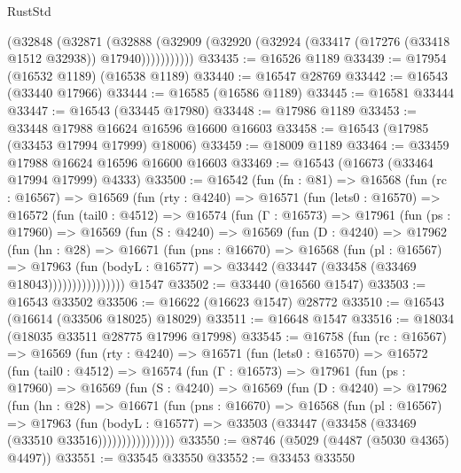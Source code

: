 \begin{lexlean}{RustStd}
\begin{coremodule}
            (@32848
              (@32871
                (@32888
                  (@32909 (@32920 (@32924 (@33417 (@17276 (@33418 @1512 @32938)) @17940)))))))))))
@33435 := @16526 @1189
@33439 := @17954 (@16532 @1189) (@16538 @1189)
@33440 := @16547 @28769
@33442 := @16543 (@33440 @17966)
@33444 := @16585 (@16586 @1189)
@33445 := @16581 @33444
@33447 := @16543 (@33445 @17980)
@33448 := @17986 @1189
@33453 := @33448 @17988 @16624 @16596 @16600 @16603
@33458 := @16543 (@17985 (@33453 @17994 @17999) @18006)
@33459 := @18009 @1189
@33464 := @33459 @17988 @16624 @16596 @16600 @16603
@33469 := @16543 (@16673 (@33464 @17994 @17999) @4333)
@33500 := @16542
    (fun (fn : @81) =>
    @16568
      (fun (rc : @16567) =>
      @16569
        (fun (rty : @4240) =>
        @16571
          (fun (lets0 : @16570) =>
          @16572
            (fun (tail0 : @4512) =>
            @16574
              (fun (Γ : @16573) =>
              @17961
                (fun (ps : @17960) =>
                @16569
                  (fun (S : @4240) =>
                  @16569
                    (fun (D : @4240) =>
                    @17962
                      (fun (hn : @28) =>
                      @16671
                        (fun (pns : @16670) =>
                        @16568
                          (fun (pl : @16567) =>
                          @17963
                            (fun (bodyL : @16577) =>
                            @33442 (@33447 (@33458 (@33469 @18043))))))))))))))))
    @1547
@33502 := @33440 (@16560 @1547)
@33503 := @16543 @33502
@33506 := @16622 (@16623 @1547) @28772
@33510 := @16543 (@16614 (@33506 @18025) @18029)
@33511 := @16648 @1547
@33516 := @18034 (@18035 @33511 @28775 @17996 @17998)
@33545 := @16758
    (fun (rc : @16567) =>
    @16569
      (fun (rty : @4240) =>
      @16571
        (fun (lets0 : @16570) =>
        @16572
          (fun (tail0 : @4512) =>
          @16574
            (fun (Γ : @16573) =>
            @17961
              (fun (ps : @17960) =>
              @16569
                (fun (S : @4240) =>
                @16569
                  (fun (D : @4240) =>
                  @17962
                    (fun (hn : @28) =>
                    @16671
                      (fun (pns : @16670) =>
                      @16568
                        (fun (pl : @16567) =>
                        @17963
                          (fun (bodyL : @16577) =>
                          @33503 (@33447 (@33458 (@33469 (@33510 @33516))))))))))))))))
@33550 := @8746 (@5029 (@4487 (@5030 @4365) @4497))
@33551 := @33545 @33550
@33552 := @33453 @33550

\end{coremodule}
\end{lexlean}
